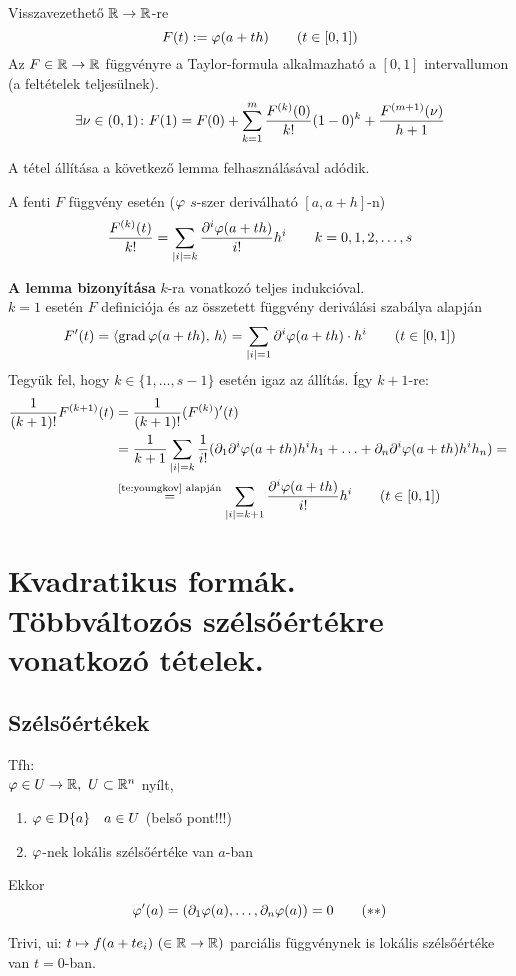 \begin{biz}Visszavezethető $\mathbb{R}\to\mathbb{R}$-re\\
  \[ F(t) := \varphi(a+th)\qquad(t\in[0,1])\]
  Az $F\in\mathbb{R}\to\mathbb{R}$ függvényre a Taylor-formula alkalmazható a $[0,1]$ intervallumon (a feltételek teljesülnek).\\
  \[\displaystyle\exists \nu\in(0,1)\colon F(1) = F(0) + \sum_{k=1}^m \dfrac{F^{(k)}(0)}{k!} (1-0)^k + 
  \dfrac{F^{(m+1)}(\nu)} {h+1}\]
  
  A tétel állítása a következő lemma felhasználásával adódik.
  \begin{lemma} A fenti $F$ függvény esetén ($\varphi$ $s$-szer deriválható $[a,a+h]$-n)
    \[\displaystyle\dfrac{F^{(k)}(t)}{k!}= \sum_{|i|=k}\dfrac{\partial^i\varphi(a+th)}{i!}h^i\qquad k=0,1,2,\dotsc,s\]
  \end{lemma}
  \textbf{A lemma bizonyítása} $k$-ra vonatkozó teljes indukcióval.\\
  $k=1$ esetén $F$ definiciója és az összetett függvény deriválási szabálya alapján
  \[ F'(t) = \langle\operatorname{grad} \varphi(a+th),\,h\rangle = \sum_{|i|=1} \partial^i \varphi(a+th)\cdot h^i\qquad(t\in[0,1])\]
  Tegyük fel, hogy $k\in\{1,\dotsc,s-1\}$ esetén igaz az állítás. Így $k+1$-re:
  \begin{align*}
    \dfrac1{(k+1)!}F^{(k+1)}(t) &= \dfrac1{(k+1)!}(F^{(k)})'(t)\\
    &=\dfrac1{k+1}\sum_{|i|=k} \dfrac1{i!}
    (\partial_1\partial^i\varphi(a+th)h^ih_1+\ldots + \partial_n\partial^i\varphi(a+th)h^ih_n) ={}\\
    &\stackrel{\text{\ref{te:youngkov} alapján}}{=}
    \sum_{|i|=k+1}\dfrac{\partial^i\varphi(a+th)}{i!}h^i\qquad(t\in[0,1])
  \end{align*}
\end{biz}

\newpage
\section[Kvadratikus formák. Többváltozós szélsőértékre vonatkozó tételek.]
	{Kvadratikus formák.\\Többváltozós szélsőértékre vonatkozó tételek.}

\subsection{Szélsőértékek}
\begin{te}
Tfh: \\$\varphi\in U\to\mathbb{R},\ U\subset \mathbb{R}^n$ nyílt,
\begin{enumerate}
\item $\varphi \in \operatorname{D}\{a\}\quad a\in U$ (belső pont!!!)
\item $\varphi$-nek lokális szélsőértéke van $a$-ban
\end{enumerate}
Ekkor  \[\varphi'(a) = (\partial_1\varphi(a),\dotsc,\partial_n\varphi(a))=0\tag{$**$}\label{eq:**}\]

\end{te}
\begin{biz}Trivi, ui: $t\mapsto f(a+te_i)\ (\in\R\n\R)$ parciális függvénynek is lokális szélsőértéke van $t=0$-ban.
\end{biz}

